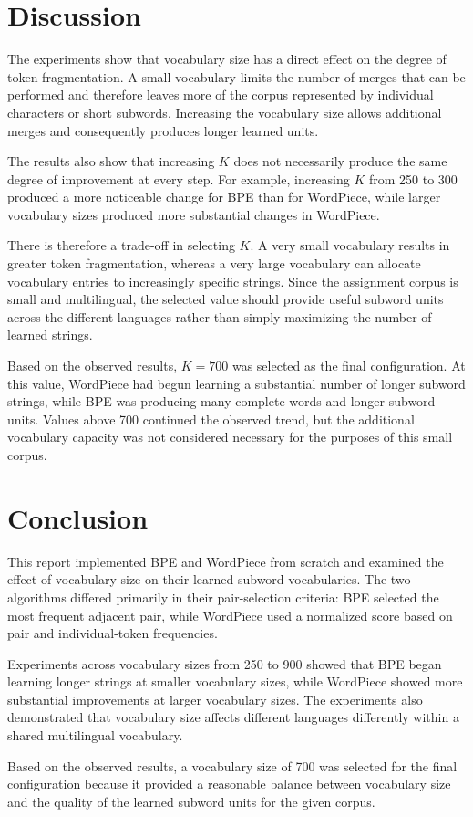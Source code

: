 \documentclass[sigconf]{acmart}
\begin{document}
\section{Discussion}

The experiments show that vocabulary size has a direct effect on the
degree of token fragmentation. A small vocabulary limits the number of
merges that can be performed and therefore leaves more of the corpus
represented by individual characters or short subwords. Increasing the
vocabulary size allows additional merges and consequently produces
longer learned units.

The results also show that increasing \(K\) does not necessarily
produce the same degree of improvement at every step. For example,
increasing \(K\) from 250 to 300 produced a more noticeable change for
BPE than for WordPiece, while larger vocabulary sizes produced more
substantial changes in WordPiece.

There is therefore a trade-off in selecting \(K\). A very small
vocabulary results in greater token fragmentation, whereas a very large
vocabulary can allocate vocabulary entries to increasingly specific
strings. Since the assignment corpus is small and multilingual, the
selected value should provide useful subword units across the different
languages rather than simply maximizing the number of learned strings.

Based on the observed results, \(K=700\) was selected as the final
configuration. At this value, WordPiece had begun learning a
substantial number of longer subword strings, while BPE was producing
many complete words and longer subword units. Values above 700
continued the observed trend, but the additional vocabulary capacity
was not considered necessary for the purposes of this small corpus.

\section{Conclusion}

This report implemented BPE and WordPiece from scratch and examined the
effect of vocabulary size on their learned subword vocabularies. The
two algorithms differed primarily in their pair-selection criteria:
BPE selected the most frequent adjacent pair, while WordPiece used a
normalized score based on pair and individual-token frequencies.

Experiments across vocabulary sizes from 250 to 900 showed that BPE
began learning longer strings at smaller vocabulary sizes, while
WordPiece showed more substantial improvements at larger vocabulary
sizes. The experiments also demonstrated that vocabulary size affects
different languages differently within a shared multilingual
vocabulary.

Based on the observed results, a vocabulary size of 700 was selected
for the final configuration because it provided a reasonable balance
between vocabulary size and the quality of the learned subword units
for the given corpus.
\end{document}
